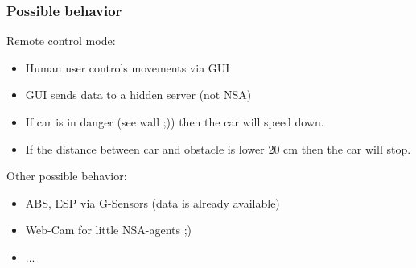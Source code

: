 \subsubsection{Possible behavior}

Remote control mode:
\begin{itemize}
	\item Human user controls movements via GUI
	\item GUI sends data to a hidden server (not NSA)
	\item If car is in danger (see wall ;)) then the car will speed down.
	\item If the distance between car and obstacle is lower 20 cm then the car will stop.
\end{itemize}

Other possible behavior:
\begin{itemize}
	\item ABS, ESP via G-Sensors (data is already available)
	\item Web-Cam for little NSA-agents ;)
	\item ...
\end{itemize}


